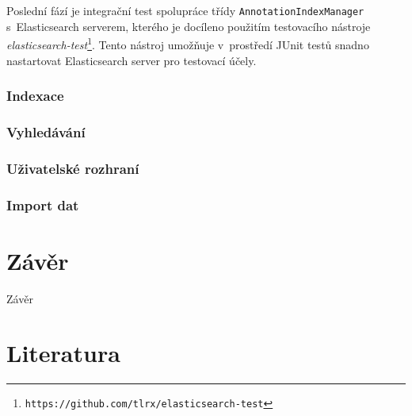 \documentclass[11pt,oneside]{fithesis2}
\begin{document}
Poslední fází je integrační test spolupráce třídy \texttt{AnnotationIndexManager} s~Elasticsearch serverem, kterého je docíleno použitím testovacího nástroje \emph{elasticsearch-test}\footnote{\texttt{https://github.com/tlrx/elasticsearch-test}}. Tento nástroj umožňuje v~prostředí JUnit testů snadno nastartovat Elasticsearch server pro testovací účely.

\subsection{Indexace}

\subsection{Vyhledávání}

\subsection{Uživatelské rozhraní}

\subsection{Import dat}

\chapter{Závěr}
Závěr



\printindex

\begingroup
\def\tmpchapter{0}
\renewcommand{\chaptername}{}
\renewcommand{\thechapter}{}
\chapter{Literatura}
\renewcommand{\chapter}[2]{}%
\end{document}
